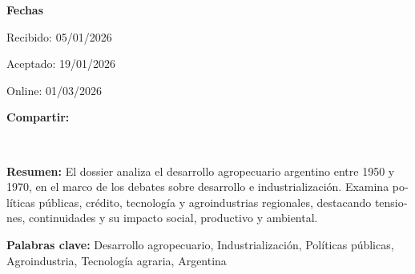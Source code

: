 \begin{textblock*}{68mm}
{\begin{minipage}[t]{68mm}
{\bfseries\color{azulrevista!70}Fechas}\par\vspace{2pt}
Recibido: 05/01/2026\par
Aceptado: 19/01/2026\par
Online: 01/03/2026\par
\vspace{6pt}
\vspace{6pt}
{\bfseries\color{azulrevista!70}Compartir:}\par\vspace{3pt}
{\large
\href{https://bsky.app/intent/compose?text=url-html}{}~
\href{mailto:?subject=El%20desarrollo%20agropecuario%20argentino%20en%20la%20segunda%20posguerra&body=url-html}{}~
\href{https://www.facebook.com/sharer/sharer.php?u=url-html}{}~
\href{https://www.linkedin.com/sharing/share-offsite/?url=url-html}{}~
\href{https://www.reddit.com/submit?url=url-html&title=El%20desarrollo%20agropecuario%20argentino%20en%20la%20segunda%20posguerra}{}~
\href{https://www.researchgate.net/search?q=El%20desarrollo%20agropecuario%20argentino%20en%20la%20segunda%20posguerra}{}~
\href{https://t.me/share/url?url=url-html&text=El%20desarrollo%20agropecuario%20argentino%20en%20la%20segunda%20posguerra}{}~
\href{https://wa.me/?text=url-html}{}~
\href{https://twitter.com/intent/tweet?url=url-html&text=El%20desarrollo%20agropecuario%20argentino%20en%20la%20segunda%20posguerra}{}
}\par
\end{minipage}%
}%
\end{textblock*}


\begin{tcolorbox}[colback=brown!8!white,colframe=brown!8!white,boxrule=0pt,arc=2pt,left=4pt,right=4pt,top=3pt,bottom=3pt,before skip=4pt,after skip=4pt]
\begin{otherlanguage}{spanish}
\sffamily\small \textbf{Resumen:} El dossier analiza el desarrollo agropecuario argentino entre 1950 y 1970, en el marco de los debates sobre desarrollo e industrialización. Examina políticas públicas, crédito, tecnología y agroindustrias regionales, destacando tensiones, continuidades y su impacto social, productivo y ambiental.
\par\smallskip\noindent\textbf{Palabras clave:} Desarrollo agropecuario, Industrialización, Políticas públicas, Agroindustria, Tecnología agraria, Argentina
\end{otherlanguage}
\end{tcolorbox}

